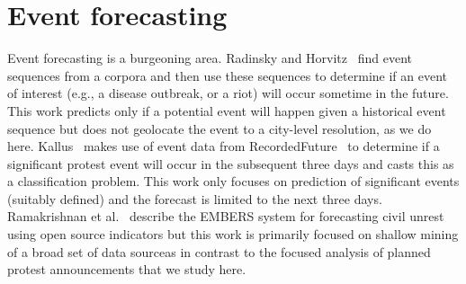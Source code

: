 \section{Event forecasting}
\vspace{-.8em}
Event forecasting is a burgeoning area. 
Radinsky and Horvitz~\cite{Radinsky:2013:MWP} find event sequences from a corpora and then use these sequences to determine if 
an event of interest (e.g., a disease outbreak, or a riot)
will occur sometime in the future. This work predicts only if a potential event will happen given a historical event sequence
but does not geolocate the event to a city-level resolution, as we do here.
Kallus~\cite{nathankallus} makes use of event data from 
RecordedFuture~\cite{recordedFuture} to determine if a  significant protest event will occur in 
the subsequent three days and casts this as a classification problem.
This work only focuses on prediction of significant events (suitably defined) and
the forecast is limited to the next three days. Ramakrishnan et al.~\cite{emberskdd} describe the EMBERS
system for forecasting civil unrest using open source indicators but this work is primarily focused on shallow mining of
a broad set of data sourceas in contrast to the focused analysis of planned protest announcements that we study here.
\vspace{-.8em}

